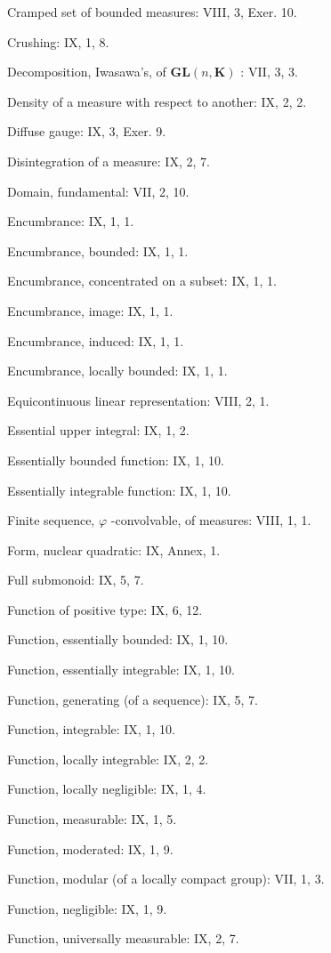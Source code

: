 Cramped set of bounded measures: VIII, 3, Exer. 10.

Crushing: IX, 1, 8.

Decomposition, Iwasawa's, of \(\mathbf{GL}(n,\mathbf{K})\) : VII, 3, 3.

Density of a measure with respect to another: IX, 2, 2.

Diffuse gauge: IX, 3, Exer. 9.

Disintegration of a measure: IX, 2, 7.

Domain, fundamental: VII, 2, 10.

Encumbrance: IX, 1, 1.

Encumbrance, bounded: IX, 1, 1.

Encumbrance, concentrated on a subset: IX, 1, 1.

Encumbrance, image: IX, 1, 1.

Encumbrance, induced: IX, 1, 1.

Encumbrance, locally bounded: IX, 1, 1.

Equicontinuous linear representation: VIII, 2, 1.

Essential upper integral: IX, 1, 2.

Essentially bounded function: IX, 1, 10.

Essentially integrable function: IX, 1, 10.

Finite sequence, \(\varphi\) -convolvable, of measures: VIII, 1, 1.

Form, nuclear quadratic: IX, Annex, 1.

Full submonoid: IX, 5, 7.

Function of positive type: IX, 6, 12.

Function, essentially bounded: IX, 1, 10.

Function, essentially integrable: IX, 1, 10.

Function, generating (of a sequence): IX, 5, 7.

Function, integrable: IX, 1, 10.

Function, locally integrable: IX, 2, 2.

Function, locally negligible: IX, 1, 4.

Function, measurable: IX, 1, 5.

Function, moderated: IX, 1, 9.

Function, modular (of a locally compact group): VII, 1, 3.

Function, negligible: IX, 1, 9.

Function, universally measurable: IX, 2, 7.

